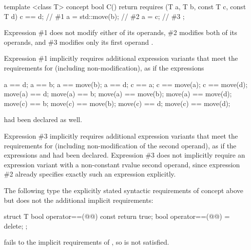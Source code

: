 \begin{addedblock}

\enterexample
\begin{codeblock}
template <class T>
concept bool C() {
  return requires (T a, T b, const T c, const T d) {
    c == d;       // \#1
    a = std::move(b);  // \#2
    a = c;        // \#3
  };
}
\end{codeblock}

Expression \#1 does not modify either of its operands, \#2 modifies both of its
operands, and \#3 modifies only its first operand .

Expression \#1 implicitly requires additional expression variants that meet the
requirements for  (including non-modification), as if the expressions
\begin{codeblock}
a == d;       a == b;             a == move(b);       a == d;
c == a;       c == move(a);       c == move(d);
move(a) == d; move(a) == b;       move(a) == move(b); move(a) == move(d);
move(c) == b; move(c) == move(b); move(c) == d;       move(c) == move(d);
\end{codeblock}
had been declared as well.

Expression \#3 implicitly requires additional expression variants that meet the
requirements for  (including non-modification of the second operand),
as if the expressions  and  had been declared.
Expression \#3 does not implicitly require an expression variant with a
non-constant rvalue second operand, since expression \#2 already specifies exactly
such an expression explicitly.
\exitexample

{\color{newclr}
\enterexample
The following type   the explicitly stated syntactic requirements
of concept  above but does not  the additional implicit requirements:

\begin{codeblock}
struct T {
  bool operator==(@@) const { return true; }
  bool operator==(@@) = delete;
};
\end{codeblock}

 fails to  the implicit
requirements of , so  is not satisfied.
 
\exitexample
}


\end{addedblock}
